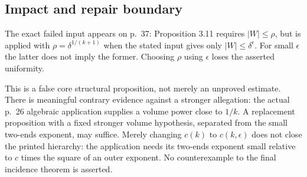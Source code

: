 \documentclass[10pt]{article}
\begin{document}
\subsection*{Impact and repair boundary}
The exact failed input appears on p. 37: Proposition 3.11 requires \(|W|\le\rho\), but is applied with \(\rho=\delta^{1/(k+1)}\) when the stated input gives only \(|W|\le\delta^\epsilon\). For small \(\epsilon\) the latter does not imply the former. Choosing \(\rho\) using \(\epsilon\) loses the asserted uniformity.\par
This is a false core structural proposition, not merely an unproved estimate. There is meaningful contrary evidence against a stronger allegation: the actual p. 26 algebraic application supplies a volume power close to \(1/k\). A replacement proposition with a fixed stronger volume hypothesis, separated from the small two-ends exponent, may suffice. Merely changing \(c(k)\) to \(c(k,\epsilon)\) does not close the printed hierarchy: the application needs its two-ends exponent small relative to \(c\) times the square of an outer exponent. No counterexample to the final incidence theorem is asserted.\par
\end{document}
